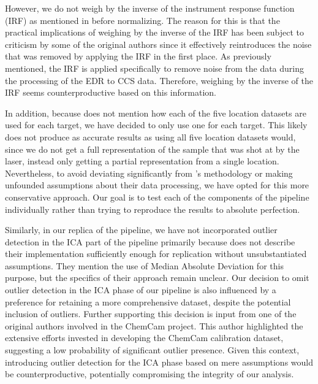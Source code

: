 However, we do not weigh by the inverse of the instrument response function (IRF) as mentioned in \citeauthor{cleggRecalibrationMarsScience2017} before normalizing.
The reason for this is that the practical implications of weighing by the inverse of the IRF has been subject to criticism by some of the original authors since it effectively reintroduces the noise that was removed by applying the IRF in the first place.
As previously mentioned, the IRF is applied specifically to remove noise from the data during the processing of the EDR to CCS data.
Therefore, weighing by the inverse of the IRF seems counterproductive based on this information.

In addition, because \citeauthor{cleggRecalibrationMarsScience2017} does not mention how each of the five location datasets are used for each target, we have decided to only use one for each target.
This likely does not produce as accurate results as using all five location datasets would, since we do not get a full representation of the sample that was shot at by the laser, instead only getting a partial representation from a single location.
Nevertheless, to avoid deviating significantly from \citeauthor{cleggRecalibrationMarsScience2017}'s methodology or making unfounded assumptions about their data processing, we have opted for this more conservative approach.
Our goal is to test each of the components of the pipeline individually rather than trying to reproduce the results to absolute perfection.

Similarly, in our replica of the pipeline, we have not incorporated outlier detection in the ICA part of the pipeline primarily because \citeauthor{cleggRecalibrationMarsScience2017} does not describe their implementation sufficiently enough for replication without unsubstantiated assumptions.
They mention the use of Median Absolute Deviation for this purpose, but the specifics of their approach remain unclear.
Our decision to omit outlier detection in the ICA phase of our pipeline is also influenced by a preference for retaining a more comprehensive dataset, despite the potential inclusion of outliers.
Further supporting this decision is input from one of the original authors involved in the ChemCam project.
This author highlighted the extensive efforts invested in developing the ChemCam calibration dataset, suggesting a low probability of significant outlier presence.
Given this context, introducing outlier detection for the ICA phase based on mere assumptions would be counterproductive, potentially compromising the integrity of our analysis.

